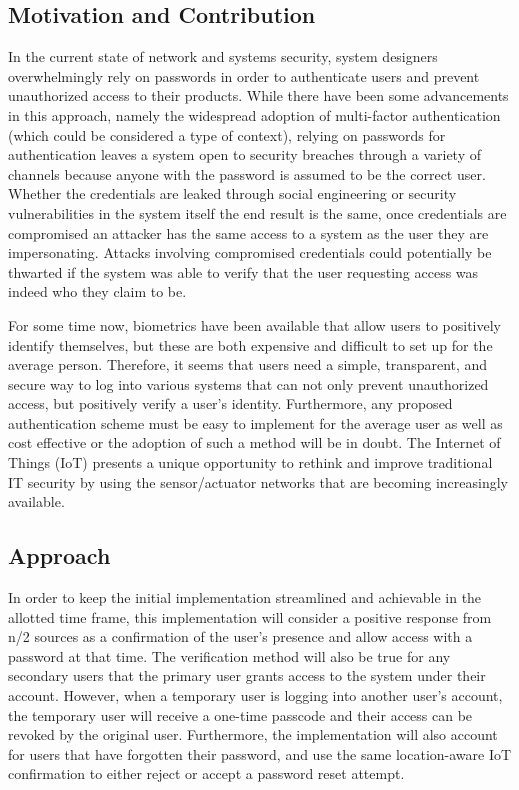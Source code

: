 \documentclass[11pt,journal]{IEEEtran}
\begin{document}
\subsection{Motivation and Contribution}
In the current state of network and systems security, system designers overwhelmingly rely on passwords in order to authenticate users and prevent unauthorized access to their products.  While there have been some advancements in this approach, namely the widespread adoption of multi-factor authentication (which could be considered a type of context), relying on passwords for authentication leaves a system open to security breaches through a variety of channels because anyone with the password is assumed to be the correct user.  Whether the credentials are leaked through social engineering or security vulnerabilities in the system itself the end result is the same, once credentials are compromised an attacker has the same access to a system as the user they are impersonating.  Attacks involving compromised credentials could potentially be thwarted if the system was able to verify that the user requesting access was indeed who they claim to be.

For some time now, biometrics have been available that allow users to positively identify themselves, but these are both expensive and difficult to set up for the average person.  Therefore, it seems that users need a simple, transparent, and secure way to log into various systems that can not only prevent unauthorized access, but positively verify a user’s identity.  Furthermore, any proposed authentication scheme must be easy to implement for the average user as well as cost effective or the adoption of such a method will be in doubt.  The Internet of Things (IoT) presents a unique opportunity to rethink and improve traditional IT security by using the sensor/actuator networks that are becoming increasingly available. 

\subsection{Approach}
In order to keep the initial implementation streamlined and achievable in the allotted time frame, this implementation will consider a positive response from n/2 sources as a confirmation of the user’s presence and allow access with a password at that time.  The verification method will also be true for any secondary users that the primary user grants access to the system under their account.  However, when a temporary user is logging into another user's account, the temporary user will receive a one-time passcode and their access can be revoked by the original user.  Furthermore, the implementation will also account for users that have forgotten their password, and use the same location-aware IoT confirmation to either reject or accept a password reset attempt.
\end{document}
